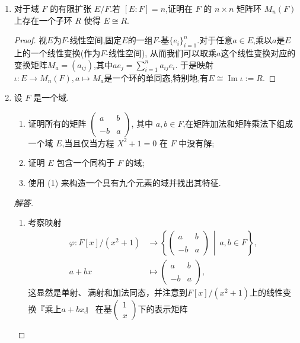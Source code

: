 \begin{enumerate}
    \item 对于域 $ F $ 的有限扩张 $ E/F $.若 $ [E : F] = n $,证明在 $ F $ 的 $ n \times n $ 矩阵环 $ M_n(F) $ 上存在一个子环 $ R $ 使得 $ E \cong R $.
    \begin{proof}
        视$E$为$F$-线性空间,固定$E$的一组$F$-基$\{e_i\}_{i=1}^n$.对于任意$a\in E$,乘以$a$是$E$上的一个线性变换(作为$F$-线性空间),
        从而我们可以取乘$a$这个线性变换对应的变换矩阵$M_a=(a_{ij})$,其中$ae_j=\sum\limits_{i=1}^na_{ij}e_i$.
        于是映射$\iota:E \to M_n(F),a \mapsto M_a$是一个环的单同态,特别地,有$E \cong \operatorname{Im}\iota:=R$.
    \end{proof}
    

    \item 设 $ F $ 是一个域.
    \begin{enumerate}[label=(\arabic*)]
        \item 证明所有的矩阵 
        $\begin{pmatrix}
        a & b \\ \\
        -b & a
        \end{pmatrix}$, 其中 $ a, b \in F $,在矩阵加法和矩阵乘法下组成一个域 $ E $,当且仅当方程 $ X^2 + 1 = 0 $ 在 $ F $ 中没有解;
        \item 证明 $ E $ 包含一个同构于 $ F $ 的域;
        \item 使用 (1) 来构造一个具有九个元素的域并找出其特征.
    \end{enumerate}
\begin{proof}[解答]
    \begin{enumerate}[label=(\arabic*)]
    \item 考察映射
    \begin{align*}
        \varphi:F[x]/(x^2+1)&\to\left\{\begin{pmatrix}a&b\\ \\-b&a\end{pmatrix}\,\middle|\,a,b \in F\right\},\\
        a+bx&\mapsto\begin{pmatrix}a&b\\ \\-b&a\end{pmatrix},
    \end{align*}
    这显然是单射、\,满射和加法同态，并注意到$F[x]/(x^2+1)$上的线性变换『乘上$a+bx$』
    在基$\begin{pmatrix}1\\ \\x\end{pmatrix}$下的表示矩阵

\end{enumerate}
\end{proof}
\end{enumerate}
